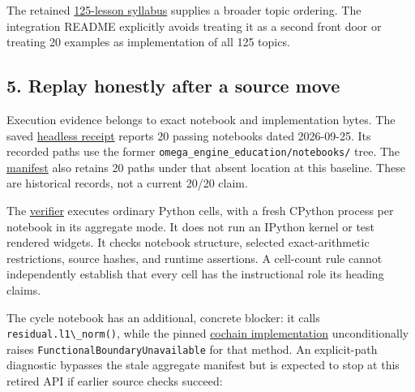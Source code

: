 \documentclass[
  11pt,
]{article}
\newcommand{\passthrough}[1]{#1}
\begin{document}
The retained
\href{https://github.com/dbccpage/the_symbol_game/blob/52cb5457f6c485ba548cfd292f6012a941ed22cf/omega_engine_education/the_symbol_game/lessons/curriculum_125_master.md}{125-lesson
syllabus} supplies a broader topic ordering. The integration README
explicitly avoids treating it as a second front door or treating 20
examples as implementation of all 125 topics.

\subsection{5. Replay honestly after a source
move}\label{replay-honestly-after-a-source-move}

Execution evidence belongs to exact notebook and implementation bytes.
The saved
\href{https://github.com/dbccpage/the_symbol_game/blob/52cb5457f6c485ba548cfd292f6012a941ed22cf/omega_engine_education/the_symbol_game/lessons/system_integration/headless_receipt.json}{headless
receipt} reports 20 passing notebooks dated 2026-09-25. Its recorded
paths use the former \nolinkurl{omega_engine_education/notebooks/} tree.
The
\href{https://github.com/dbccpage/the_symbol_game/blob/52cb5457f6c485ba548cfd292f6012a941ed22cf/omega_engine_education/the_symbol_game/lessons/system_integration/lesson_manifest.json}{manifest}
also retains 20 paths under that absent location at this baseline. These
are historical records, not a current 20/20 claim.

The
\href{https://github.com/dbccpage/the_symbol_game/blob/52cb5457f6c485ba548cfd292f6012a941ed22cf/omega_engine_education/scripts/verify_system_integration.py}{verifier}
executes ordinary Python cells, with a fresh CPython process per
notebook in its aggregate mode. It does not run an IPython kernel or
test rendered widgets. It checks notebook structure, selected
exact-arithmetic restrictions, source hashes, and runtime assertions. A
cell-count rule cannot independently establish that every cell has the
instructional role its heading claims.

The cycle notebook has an additional, concrete blocker: it calls
\passthrough{\lstinline!residual.l1\_norm()!}, while the pinned
\href{https://github.com/dbccpage/the_symbol_game/blob/52cb5457f6c485ba548cfd292f6012a941ed22cf/omega_engine_symbol_game/domain/ddc/cochains.py}{cochain
implementation} unconditionally raises
\passthrough{\lstinline!FunctionalBoundaryUnavailable!} for that method.
An explicit-path diagnostic bypasses the stale aggregate manifest but is
expected to stop at this retired API if earlier source checks succeed:
\end{document}
